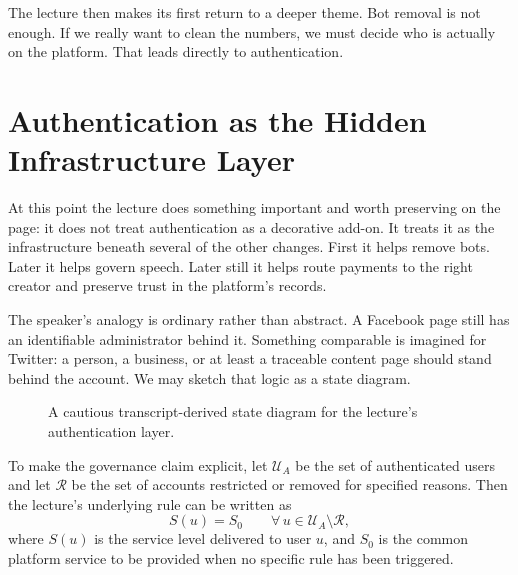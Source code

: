 The lecture then makes its first return to a deeper theme. Bot removal is not enough. If we really want to clean the numbers, we must decide who is actually on the platform. That leads directly to authentication.

\section{Authentication as the Hidden Infrastructure Layer}

At this point the lecture does something important and worth preserving on the page: it does not treat authentication as a decorative add-on. It treats it as the infrastructure beneath several of the other changes. First it helps remove bots. Later it helps govern speech. Later still it helps route payments to the right creator and preserve trust in the platform's records.

The speaker's analogy is ordinary rather than abstract. A Facebook page still has an identifiable administrator behind it. Something comparable is imagined for Twitter: a person, a business, or at least a traceable content page should stand behind the account. We may sketch that logic as a state diagram.

\begin{figure}[h]
\centering
{}
\caption{A cautious transcript-derived state diagram for the lecture's authentication layer.}
\end{figure}

To make the governance claim explicit, let \(\mathcal U_A\) be the set of authenticated users and let \(\mathcal R\) be the set of accounts restricted or removed for specified reasons. Then the lecture's underlying rule can be written as
\begin{equation}
S(u) = S_0
\qquad
\forall\, u \in \mathcal U_A \setminus \mathcal R,
\end{equation}
where \(S(u)\) is the service level delivered to user \(u\), and \(S_0\) is the common platform service to be provided when no specific rule has been triggered.

